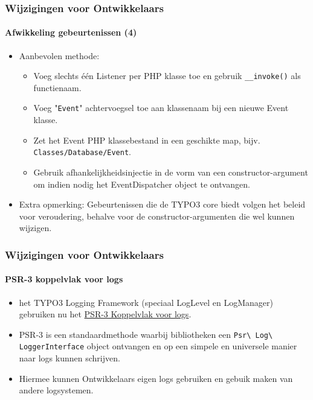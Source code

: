 
\begin{frame}[fragile]
	\frametitle{Wijzigingen voor Ontwikkelaars}
	\framesubtitle{Afwikkeling gebeurtenissen (4)}

	\lstset{basicstyle=\tiny\ttfamily}

	\begin{itemize}
		\item Aanbevolen methode:

			\begin{itemize}
				\item Voeg slechts één Listener per PHP klasse toe en gebruik \texttt{\_\_invoke()} als functienaam.
				\item Voeg "\texttt{Event}" achtervoegsel toe aan klassenaam bij een nieuwe Event klasse.
				\item Zet het Event PHP klassebestand in een geschikte map, bijv. \texttt{Classes/Database/Event}.
				\item Gebruik afhankelijkheidsinjectie in de vorm van een constructor-argument om indien nodig
					het EventDispatcher object te ontvangen.
			\end{itemize}

		\item Extra opmerking:\newline
			\small
				Gebeurtenissen die de TYPO3 core biedt volgen het beleid voor veroudering, behalve voor de constructor-argumenten
				die wel kunnen wijzigen.
			\normalsize

	\end{itemize}

\end{frame}


\begin{frame}[fragile]
	\frametitle{Wijzigingen voor Ontwikkelaars}
	\framesubtitle{PSR-3 koppelvlak voor logs}

	\begin{itemize}
		\item het TYPO3 Logging Framework (speciaal LogLevel en LogManager) gebruiken nu het
			\href{https://www.php-fig.org/psr/psr-3/}{PSR-3 Koppelvlak voor logs}.

		\item PSR-3 is een standaardmethode waarbij bibliotheken een
			\texttt{Psr\textbackslash
				Log\textbackslash
				LoggerInterface} object ontvangen en op een simpele en universele manier
				naar logs kunnen schrijven.

			\item Hiermee kunnen Ontwikkelaars eigen logs gebruiken en gebuik maken van
				andere logsystemen.

	\end{itemize}

\end{frame}

